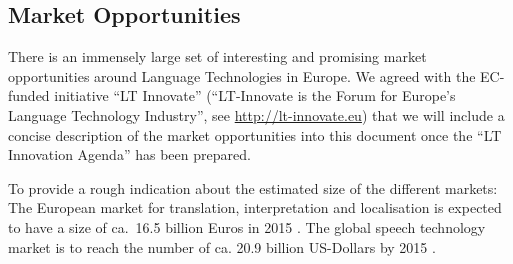 \documentclass[10pt, plain]{../../metanetpaper}
\begin{document}
\begin{multicols}{2}
\subsection{Market Opportunities}
\label{sec:lang-techn-industry}

There is an immensely large set of interesting and promising market opportunities around Language Technologies in Europe. We agreed with the EC-funded initiative ``LT Innovate'' (``LT-Innovate is the Forum for Europe's Language Technology Industry'', see \url{http://lt-innovate.eu}) that we will include a concise description of the market opportunities into this document once the ``LT Innovation Agenda'' has been prepared.

To provide a rough indication about the estimated size of the different markets: The European market for translation, interpretation and localisation is expected to have a size of ca.~16.5 billion Euros in 2015 \cite{EC3}. The global speech technology market is to reach the number of ca. 20.9 billion US-Dollars by 2015 \cite{gia2012}.

\end{multicols}

\clearpage
\end{document}
